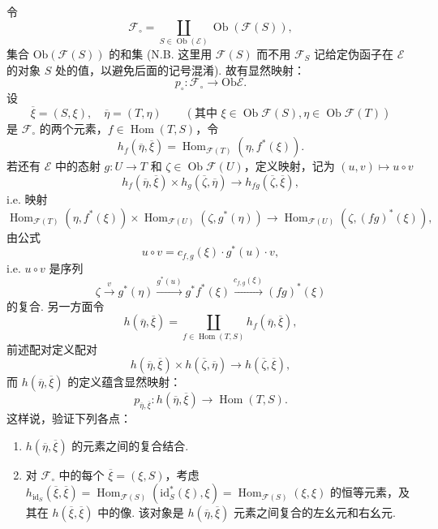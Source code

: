 令
\[
\mathcal{F}_{\circ} = \coprod_{S \in \operatorname{Ob}(\mathcal{E})} \operatorname{Ob}(\mathcal{F}(S)),
\]
集合 $\mathrm{Ob}(\mathcal{F}(S))$ 的和集 (N.B. 这里用 $\mathcal{F}(S)$ 而不用 $\mathcal{F}_S$ 记给定伪函子在 $\mathcal{E}$ 的对象 $S$ 处的值，以避免后面的记号混淆). 故有显然映射：
\[
p_{\circ} \colon \mathcal{F}_{\circ} \longrightarrow \mathrm{Ob} \mathcal{E}.
\]
设
\[
\overline{\xi} = (S, \xi), \quad \overline{\eta} = (T, \eta) \qquad (\text{其中 } \xi \in \operatorname{Ob} \mathcal{F}(S), \eta \in \operatorname{Ob} \mathcal{F}(T))
\]
是 $\mathcal{F}_{\circ}$ 的两个元素，$f \in \operatorname{Hom}(T, S)$，令
\[
h_f(\overline{\eta}, \overline{\xi}) = \operatorname{Hom}_{\mathcal{F}(T)}(\eta, f^{*}(\xi)).
\]
若还有 $\mathcal{E}$ 中的态射 $g \colon U \to T$ 和 $\zeta \in \operatorname{Ob} \mathcal{F}(U)$，定义映射，记为 $(u, v) \mapsto u \circ v$
\[
h_f(\overline{\eta}, \overline{\xi}) \times h_g(\overline{\zeta}, \overline{\eta}) \longrightarrow h_{fg}(\overline{\zeta}, \overline{\xi}),
\]
i.e. 映射
\[
\operatorname{Hom}_{\mathcal{F}(T)}(\eta, f^{*}(\xi)) \times \operatorname{Hom}_{\mathcal{F}(U)}(\zeta, g^{*}(\eta)) \longrightarrow \operatorname{Hom}_{\mathcal{F}(U)}(\zeta, (fg)^{*}(\xi)),
\]
由公式
\[
u \circ v = c_{f,g}(\xi) \cdot g^{*}(u) \cdot v,
\]
i.e. $u \circ v$ 是序列
\[
\zeta \xrightarrow{v} g^{*}(\eta) \xrightarrow{g^{*}(u)} g^{*} f^{*}(\xi) \xrightarrow{c_{f,g}(\xi)} (fg)^{*}(\xi)
\]
的复合. 另一方面令
\[
h(\overline{\eta}, \overline{\xi}) = \coprod_{f \in \operatorname{Hom}(T, S)} h_f(\overline{\eta}, \overline{\xi}),
\]
前述配对定义配对
\[
h(\overline{\eta}, \overline{\xi}) \times h(\overline{\zeta}, \overline{\eta}) \longrightarrow h(\overline{\zeta}, \overline{\xi}),
\]
而 $h(\overline{\eta}, \overline{\xi})$ 的定义蕴含显然映射：
\[
p_{\overline{\eta},\overline{\xi}} \colon h(\overline{\eta}, \overline{\xi}) \longrightarrow \operatorname{Hom}(T, S).
\]
这样说，验证下列各点：
\begin{enumerate}[1)]
\item $h(\overline{\eta}, \overline{\xi})$ 的元素之间的复合结合.
\item 对 $\mathcal{F}_{\circ}$ 中的每个 $\overline{\xi} = (\xi, S)$，考虑 $h_{\mathrm{id}_S}(\overline{\xi}, \overline{\xi}) = \operatorname{Hom}_{\mathcal{F}(S)}(\mathrm{id}_S^{*}(\xi), \xi) = \operatorname{Hom}_{\mathcal{F}(S)}(\xi, \xi)$ 的恒等元素，及其在 $h(\overline{\xi}, \overline{\xi})$ 中的像. 该对象是 $h(\overline{\eta}, \overline{\xi})$ 元素之间复合的左幺元和右幺元.
\end{enumerate}
